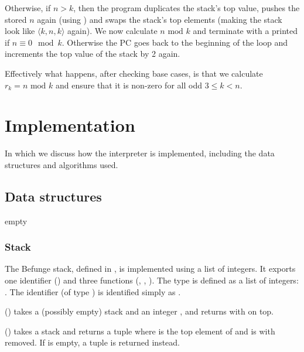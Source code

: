 \documentclass[12pt, a4paper]{article}
\begin{document}
Otherwise, if $n > k$, then the program duplicates the stack's top value, pushes the stored $n$ again (using ) and swaps the stack's top elements (making the stack look like $\langle k, n, k \rangle$ again). We now calculate $n \text{ mod } k$ and terminate with a printed  if $n \equiv 0 \mod k$. Otherwise the PC goes back to the beginning of the loop and increments the top value of the stack by 2 again.

Effectively what happens, after checking base cases, is that we calculate $r_k = n \text{ mod } k$ and ensure that it is non-zero for all odd $3 \leq k < n$.

\section{Implementation}
\label{sec:impl}

In which we discuss how the interpreter is implemented, including the data structures and algorithms used.

\subsection{Data structures}
\label{sec:structures}

empty

\subsubsection{Stack}
\label{sec:structstack}

The Befunge stack, defined in , is implemented using a list of integers. It exports one identifier () and three functions (, , ). The type  is defined as a list of integers: . The identifier  (of type ) is identified simply as .

\vspace{6pt}
\noindent
{} () takes a (possibly empty) stack  and an integer , and returns  with  on top.

\vspace{6pt}
\noindent
{} () takes a stack  and returns a tuple  where  is the top element of  and  is  with  removed. If  is empty, a tuple  is returned instead.
\end{document}
